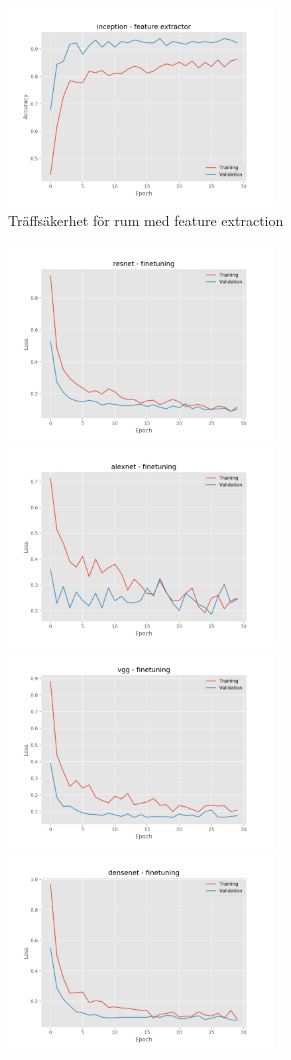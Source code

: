 \documentclass[]{kththesis}
\begin{document}
\begin{figure}[h]
    \includegraphics[width=7cm]{r_a_inception_fe}
    \caption{Träffsäkerhet för rum med feature extraction}
    \label{fig:r_a_1}
  \end{figure}
  
  \begin{figure}[h]
    \includegraphics[width=7cm]{r_l_resnet_fine}
    \includegraphics[width=7cm]{r_l_alexnet_fine}
    \includegraphics[width=7cm]{r_l_vgg_fine}
    \includegraphics[width=7cm]{r_l_densenet_fine}

\end{figure}
\end{document}
